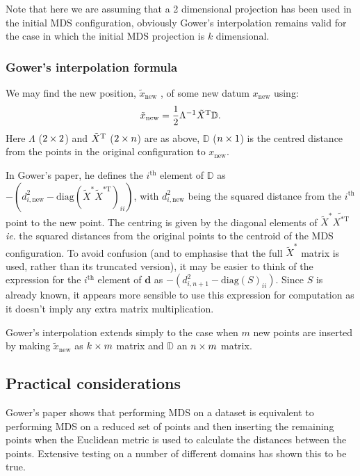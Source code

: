 Note that here we are assuming that a 2 dimensional projection has been used in the initial MDS configuration, obviously Gower's interpolation remains valid for the case in which the initial MDS projection is $k$ dimensional.

\subsubsection{Gower's interpolation formula}

We may find the new position, $\tilde{x}_{\text{new}}$ , of some new datum $x_{\text{new}}$ using:
\begin{equation}
\tilde{x}_{\text{new}} = \frac{1}{2} \Lambda^{-1} \tilde{X}^{\text{T}} \mathbb{D}.
\label{gower}
\end{equation}
Here $\Lambda$ ($2 \times 2$) and $\tilde{X}^{\text{T}}$ ($2 \times n$) are as above, $\mathbb{D}$ ($n \times 1$) is the centred distance from the points in the original configuration to $x_{\text{new}}$.

In Gower's paper, he defines the $i^\text{th}$ element of $\mathbb{D}$ as $-(d^2_{i,\text{new}}-\text{diag}(\tilde{X}^* \tilde{X}^{*\text{T}})_{ii})$, with $d^2_{i,\text{new}}$ being the squared distance from the $i^\text{th}$ point to the new point. The centring is given by the diagonal elements of $\tilde{X}^*\tilde{X^{* \text{T}}}$ \emph{ie}. the squared distances from the original points to the centroid of the MDS configuration. To avoid confusion (and to emphasise that the full $\tilde{X}^*$ matrix is used, rather than its truncated version), it may be easier to think of the expression for the $i^\text{th}$ element of $\mathbf{d}$ as $-(d^2_{i,n+1}-\text{diag}(S)_{ii})$. Since $S$ is already known, it appears more sensible to use this expression for computation as it doesn't imply any extra matrix multiplication.

Gower's interpolation extends simply to the case when $m$ new points are inserted by making $\tilde{x}_{\text{new}}$ as $k \times m$ matrix and $\mathbb{D}$ an $n \times m$ matrix.


\subsection{Practical considerations}

Gower's paper shows that performing MDS on a dataset is equivalent to performing MDS on a reduced set of points and then inserting the remaining points when the Euclidean metric is used to calculate the distances between the points. Extensive testing on a number of different domains has shown this to be true.

